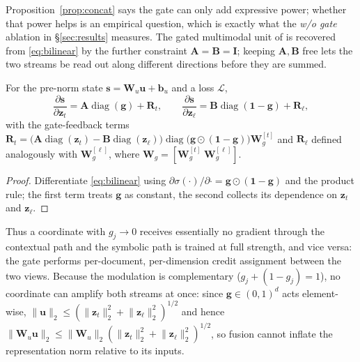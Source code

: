 Proposition~\ref{prop:concat} says the gate can only add expressive power; whether that power helps is an
empirical question, which is exactly what the \emph{w/o gate} ablation in \S\ref{sec:results} measures.
The gated multimodal unit of \citet{arevalo2017gated} is recovered from \eqref{eq:bilinear} by the
further constraint $\mathbf{A}=\mathbf{B}=\mathbf{I}$; keeping $\mathbf{A},\mathbf{B}$ free lets the two streams
be read out along different directions before they are summed.

\begin{proposition}
\label{prop:grad}
For the pre-norm state $\mathbf{s}=\mathbf{W}_u\mathbf{u}+\mathbf{b}_u$ and a loss $\mathcal{L}$,
\begin{equation}
\frac{\partial \mathbf{s}}{\partial \mathbf{z}_t}=\mathbf{A}\operatorname{diag}(\mathbf{g})+\mathbf{R}_t,
\qquad
\frac{\partial \mathbf{s}}{\partial \mathbf{z}_\ell}=\mathbf{B}\operatorname{diag}(\mathbf{1}-\mathbf{g})+\mathbf{R}_\ell,
\end{equation}
with the gate-feedback terms
$\mathbf{R}_t=\big(\mathbf{A}\operatorname{diag}(\mathbf{z}_t)-\mathbf{B}\operatorname{diag}(\mathbf{z}_\ell)\big)\operatorname{diag}\big(\mathbf{g}\odot(\mathbf{1}-\mathbf{g})\big)\mathbf{W}_g^{[t]}$
and $\mathbf{R}_\ell$ defined analogously with $\mathbf{W}_g^{[\ell]}$, where $\mathbf{W}_g=[\mathbf{W}_g^{[t]}\;\mathbf{W}_g^{[\ell]}]$.
\end{proposition}
\begin{proof}
Differentiate \eqref{eq:bilinear} using $\partial\sigma(\cdot)/\partial\cdot=\mathbf{g}\odot(\mathbf{1}-\mathbf{g})$
and the product rule; the first term treats $\mathbf{g}$ as constant, the second collects its dependence on
$\mathbf{z}_t$ and $\mathbf{z}_\ell$.
\end{proof}

Thus a coordinate with $g_j\!\to\!0$ receives essentially no gradient through the contextual path and the
symbolic path is trained at full strength, and vice versa: the gate performs per-document, per-dimension
credit assignment between the two views. Because the modulation is complementary
($g_j+(1-g_j)=1$), no coordinate can amplify both streams at once: since $\mathbf{g}\in(0,1)^d$ acts
element-wise, $\lVert\mathbf{u}\rVert_2\le(\lVert\mathbf{z}_t\rVert_2^2+\lVert\mathbf{z}_\ell\rVert_2^2)^{1/2}$ and
hence $\lVert\mathbf{W}_u\mathbf{u}\rVert_2\le\lVert\mathbf{W}_u\rVert_2(\lVert\mathbf{z}_t\rVert_2^2+\lVert\mathbf{z}_\ell\rVert_2^2)^{1/2}$,
so fusion cannot inflate the representation norm relative to its inputs.


